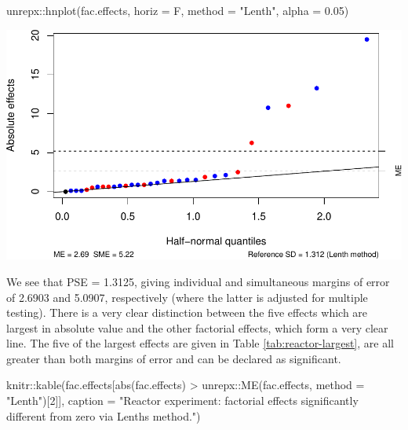 \documentclass[
]{book}
\newenvironment{Shaded}{\begin{snugshade}}{\end{snugshade}}
\newcommand{\AttributeTok}[1]{\textcolor[rgb]{0.77,0.63,0.00}{#1}}
\newcommand{\DecValTok}[1]{\textcolor[rgb]{0.00,0.00,0.81}{#1}}
\newcommand{\FloatTok}[1]{\textcolor[rgb]{0.00,0.00,0.81}{#1}}
\newcommand{\FunctionTok}[1]{\textcolor[rgb]{0.00,0.00,0.00}{#1}}
\newcommand{\NormalTok}[1]{#1}
\newcommand{\SpecialCharTok}[1]{\textcolor[rgb]{0.00,0.00,0.00}{#1}}
\newcommand{\StringTok}[1]{\textcolor[rgb]{0.31,0.60,0.02}{#1}}
\theoremstyle{definition}
\theoremstyle{definition}
\theoremstyle{definition}
\theoremstyle{definition}
\theoremstyle{remark}
\begin{document}
\begin{Shaded}
\begin{Highlighting}[]
\NormalTok{unrepx}\SpecialCharTok{::}\FunctionTok{hnplot}\NormalTok{(fac.effects, }\AttributeTok{horiz =}\NormalTok{ F, }\AttributeTok{method =} \StringTok{"Lenth"}\NormalTok{, }\AttributeTok{alpha =} \FloatTok{0.05}\NormalTok{)}
\end{Highlighting}
\end{Shaded}

\includegraphics{bookdown_math3014-6027_files/figure-latex/reactor-lenth-1.pdf}

We see that PSE = 1.3125, giving individual and simultaneous margins of error of 2.6903 and 5.0907, respectively (where the latter is adjusted for multiple testing). There is a very clear distinction between the five effects which are largest in absolute value and the other factorial effects, which form a very clear line. The five of the largest effects are given in Table \ref{tab:reactor-largest}, are all greater than both margins of error and can be declared as significant.

\begin{Shaded}
\begin{Highlighting}[]
\NormalTok{knitr}\SpecialCharTok{::}\FunctionTok{kable}\NormalTok{(fac.effects[}\FunctionTok{abs}\NormalTok{(fac.effects) }\SpecialCharTok{\textgreater{}}\NormalTok{ unrepx}\SpecialCharTok{::}\FunctionTok{ME}\NormalTok{(fac.effects, }
                                                       \AttributeTok{method =} \StringTok{"Lenth"}\NormalTok{)[}\DecValTok{2}\NormalTok{]],}
             \AttributeTok{caption =} \StringTok{"Reactor experiment: factorial effects significantly different from zero via Lenth\textquotesingle{}s method."}\NormalTok{)}
\end{Highlighting}
\end{Shaded}
\end{document}
